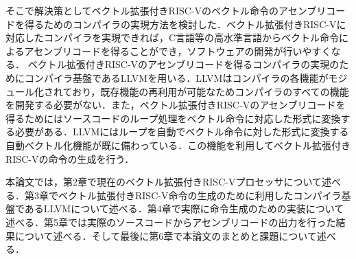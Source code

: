 そこで解決策としてベクトル拡張付きRISC-Vのベクトル命令のアセンブリコードを得るためのコンパイラの実現方法を検討した．ベクトル拡張付きRISC-Vに対応したコンパイラを実現できれば，C言語等の高水準言語からベクトル命令によるアセンブリコードを得ることができ，ソフトウェアの開発が行いやすくなる．
ベクトル拡張付きRISC-Vのアセンブリコードを得るコンパイラの実現のためにコンパイラ基盤であるLLVM\cite{bib:llvm}を用いる．LLVMはコンパイラの各機能がモジュール化されており，既存機能の再利用が可能なためコンパイラのすべての機能を開発する必要がない．また，ベクトル拡張付きRISC-Vのアセンブリコードを得るためにはソースコードのループ処理をベクトル命令に対応した形式に変換する必要がある．LLVMにはループを自動でベクトル命令に対した形式に変換する自動ベクトル化機能が既に備わっている．この機能を利用してベクトル拡張付きRISC-Vの命令の生成を行う．

本論文では，第2章で現在のベクトル拡張付きRISC-Vプロセッサについて述べる．第3章でベクトル拡張付きRISC-V命令の生成のために利用したコンパイラ基盤であるLLVMについて述べる．第4章で実際に命令生成のための実装について述べる．第5章では実際のソースコードからアセンブリコードの出力を行った結果について述べる．そして最後に第6章で本論文のまとめと課題について述べる．